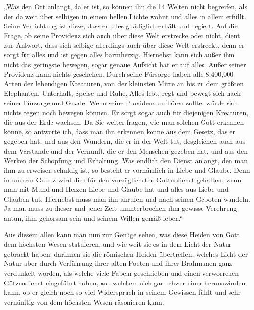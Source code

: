 \documentclass{article}
\begin{document}
„Was den Ort anlangt, da er ist, so können ihn die 14 Welten nicht begreifen, als der da weit über selbigen in einem hellen Lichte wohnt und alles in allem erfüllt. Seine Verrichtung ist diese, dass er alles gnädiglich erhält und regiert. Auf die Frage, ob seine Providenz sich auch über diese Welt erstrecke oder nicht, dient zur Antwort, dass sich selbige allerdings auch über diese Welt erstreckt, denn er sorgt für alles und ist gegen alles barmherzig. Hiernebst kann sich außer ihm nicht das geringste bewegen, sogar genaue Aufsicht hat er auf alles. Außer seiner Providenz kann nichts geschehen. Durch seine Fürsorge haben alle 8,400,000 Arten der lebendigen Kreaturen, von der kleinsten Mirre an bis zu dem größten Elephanten, Unterhalt, Speise und Ruhe. Alles lebt, regt und bewegt sich nach seiner Fürsorge und Gnade. Wenn seine Providenz aufhören sollte, würde sich nichts regen noch bewegen können. Er sorgt sogar auch für diejenigen Kreaturen, die aus der Erde wachsen. Da Sie weiter fragen, wie man solchen Gott erkennen könne, so antworte ich, dass man ihn erkennen könne aus dem Gesetz, das er gegeben hat, und aus den Wundern, die er in der Welt tut, desgleichen auch aus dem Verstande und der Vernunft, die er den Menschen gegeben hat, und aus den Werken der Schöpfung und Erhaltung. Was endlich den Dienst anlangt, den man ihm zu erweisen schuldig ist, so besteht er vornämlich in Liebe und Glaube. Denn in unserm Gesetz wird dies für den vorzüglichsten Gottesdienst gehalten, wenn man mit Mund und Herzen Liebe und Glaube hat und alles aus Liebe und Glauben tut. Hiernebst muss man ihn anrufen und nach seinen Geboten wandeln. Ja man muss zu dieser und jener Zeit ununterbrochen ihm gewisse Verehrung antun, ihm gehorsam sein und seinem Willen gemäß leben.“

Aus diesem allen kann man nun zur Genüge sehen, was diese Heiden von Gott dem höchsten Wesen statuieren, und wie weit sie es in dem Licht der Natur gebracht haben, darinnen sie die römischen Heiden übertreffen, welches Licht der Natur aber durch Verführung ihrer alten Poeten und ihrer Brahmanen ganz verdunkelt worden, als welche viele Fabeln geschrieben und einen verworrenen Götzendienst eingeführt haben, aus welchem sich gar schwer einer herauswinden kann, ob er gleich noch so viel Widerspruch in seinem Gewissen fühlt und sehr vernünftig von dem höchsten Wesen räsonieren kann.

\begin{center}
\end{center}
\end{document}
